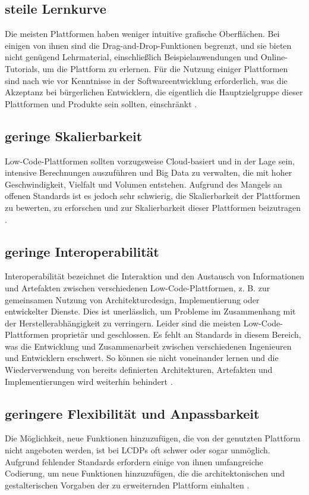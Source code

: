 \documentclass[12pt]{article} %
\begin{document}
	\subsection{steile Lernkurve}
	Die meisten Plattformen haben weniger intuitive grafische Oberflächen. Bei einigen von ihnen sind die Drag-and-Drop-Funktionen begrenzt, und sie bieten nicht genügend Lehrmaterial, einschließlich Beispielanwendungen und Online-Tutorials, um die Plattform zu erlernen. 
	Für die Nutzung einiger Plattformen sind nach wie vor Kenntnisse in der Softwareentwicklung erforderlich, was die Akzeptanz bei bürgerlichen Entwicklern, die eigentlich die Hauptzielgruppe dieser Plattformen und Produkte sein sollten, einschränkt \cite{Alamin.2023}.
	
	\subsection{geringe Skalierbarkeit}	
	Low-Code-Plattformen sollten vorzugsweise Cloud-basiert und in der Lage sein, intensive Berechnungen auszuführen und Big Data zu verwalten, die mit hoher Geschwindigkeit, Vielfalt und Volumen entstehen. Aufgrund des Mangels an offenen Standards ist es jedoch sehr schwierig, die Skalierbarkeit der Plattformen zu bewerten, zu erforschen und zur Skalierbarkeit dieser Plattformen beizutragen \cite{Alamin.2023}.
	
	\subsection{geringe Interoperabilität}
	Interoperabilität bezeichnet die Interaktion und den Austausch von Informationen und Artefakten zwischen verschiedenen Low-Code-Plattformen, z. B. zur gemeinsamen Nutzung von Architekturcdesign, Implementierung oder entwickelter Dienste. Dies ist unerlässlich, um Probleme im Zusammenhang mit der Herstellerabhängigkeit zu verringern. Leider sind die meisten Low-Code-Plattformen proprietär und geschlossen. Es fehlt an Standards in diesem Bereich, was die Entwicklung und Zusammenarbeit zwischen verschiedenen Ingenieuren und Entwicklern erschwert. So können sie nicht voneinander lernen und die Wiederverwendung von bereits definierten Architekturen, Artefakten und Implementierungen wird weiterhin behindert \cite{Alamin.2023}.  
	
	\subsection{geringere Flexibilität und Anpassbarkeit}	
	Die Möglichkeit, neue Funktionen hinzuzufügen, die von der genutzten Plattform nicht angeboten werden, ist bei LCDPs oft schwer
	oder sogar unmöglich. Aufgrund fehlender Standards erfordern einige von ihnen umfangreiche Codierung, um neue Funktionen hinzuzufügen, die die architektonischen und gestalterischen Vorgaben der zu erweiternden Plattform einhalten \cite{Alamin.2023}.
	
\end{document}
